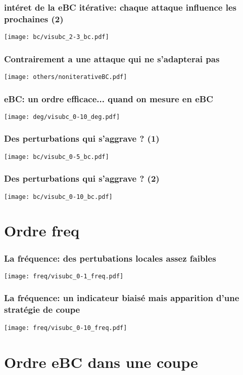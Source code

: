 \documentclass[aspectratio=169]{beamer}
\begin{document}
    \begin{frame}
        \centering
        \frametitle{intéret de la eBC itérative: chaque attaque influence les prochaines (2)}
        \texttt{[image: bc/visubc\_2-3\_bc.pdf]}
    \end{frame}

    \begin{frame}
        \frametitle{Contrairement a une attaque qui ne s'adapterai pas}
        \centering
        \texttt{[image: others/noniterativeBC.pdf]}
    \end{frame}

    \begin{frame}
        \frametitle{eBC: un ordre efficace... quand on mesure en eBC}
        \texttt{[image: deg/visubc\_0-10\_deg.pdf]}
    \end{frame}

    \begin{frame}
        \centering
        \frametitle{Des perturbations qui s'aggrave ? (1)}
        \texttt{[image: bc/visubc\_0-5\_bc.pdf]}
    \end{frame}

    \begin{frame}
        \centering
        \frametitle{Des perturbations qui s'aggrave ? (2)}
        \texttt{[image: bc/visubc\_0-10\_bc.pdf]}
    \end{frame}

    \section{Ordre freq}

    \begin{frame}
        \frametitle{La fréquence: des pertubations locales assez faibles}
        \texttt{[image: freq/visubc\_0-1\_freq.pdf]}
    \end{frame}

    \begin{frame}
        \frametitle{La fréquence: un indicateur biaisé mais apparition d'une stratégie de coupe}
        \texttt{[image: freq/visubc\_0-10\_freq.pdf]}
    \end{frame}

    \section{Ordre eBC dans une coupe}
    
\end{document}
